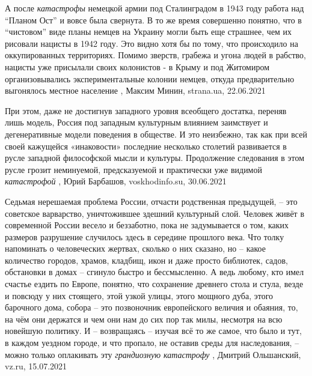  
 
 
 
 

А после \emph{катастрофы} немецкой армии под Сталинградом в 1943 году работа над
\enquote{Планом Ост} и вовсе была свернута.  В то же время совершенно понятно, что в
\enquote{чистовом} виде планы немцев на Украину могли быть еще страшнее, чем их
рисовали нацисты в 1942 году. Это видно хотя бы по тому, что происходило на
оккупированных территориях.  Помимо зверств, грабежа и угона людей в рабство,
нацисты уже присылали своих колонистов - в Крыму и под Житомиром
организовывались экспериментальные колонии немцев, откуда предварительно
выгонялось местное население
  , Максим Минин, strana.ua, 22.06.2021

При этом, даже не достигнув западного уровня всеобщего достатка, переняв лишь
модель, Россия под западным культурным влиянием заимствует и дегенеративные
модели поведения в обществе. И это неизбежно, так как при всей своей кажущейся
«инаковости» последние несколько столетий развивается в русле западной
философской мысли и культуры. Продолжение следования в этом русле грозит
неминуемой, предсказуемой и практически уже видимой \emph{катастрофой}
, 
Юрий Барбашов, voskhodinfo.su, 30.06.2021

Седьмая нерешаемая проблема России, отчасти родственная предыдущей, – это
советское варварство, уничтожившее здешний культурный слой.  Человек живёт в
современной России весело и беззаботно, пока не задумывается о том, каких
размеров разрушение случилось здесь в середине прошлого века. Что толку
напоминать о человеческих жертвах, сколько о них сказано, но – какое количество
городов, храмов, кладбищ, икон и даже просто библиотек, садов, обстановки в
домах – сгинуло быстро и бессмысленно. А ведь любому, кто имел счастье ездить
по Европе, понятно, что сохранение древнего стола и стула, везде и повсюду у
них стоящего, этой узкой улицы, этого мощного дуба, этого барочного дома,
собора – это позвоночник европейского величия и обаяния, то, на чём они
держатся и чем они нам до сих пор так милы, несмотря на всю новейшую политику.
И – возвращаясь – изучая всё то же самое, что было и тут, в каждом уездном
городе, и что пропало, не оставив среды для наследования, – можно только
оплакивать эту \emph{грандиозную катастрофу}
, 
Дмитрий Ольшанский, vz.ru, 15.07.2021
